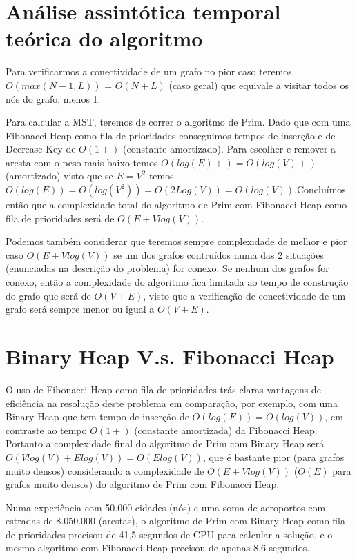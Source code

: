 \documentclass{scrartcl}
\begin{document}
\section*{Análise assintótica temporal teórica do algoritmo}

Para verificarmos a conectividade de um grafo no pior caso teremos $O(max(N-1,L))$ = $O(N+L)$ (caso geral) que equivale a visitar todos os nós do grafo, menos 1.

Para calcular a MST, teremos de correr o algoritmo de Prim. Dado que com uma Fibonacci Heap como fila de prioridades conseguimos tempos de inserção e de Decrease-Key de $O(1+)$ (constante amortizado). Para escolher e remover a aresta com o peso mais baixo temos $O(log(E)+) = O(log(V)+)$ (amortizado) visto que se $E = V^2$ temos $O(log(E)) = O(log(V^2)) = O(2Log(V)) = O(log(V))$.Concluímos então que a complexidade total do algoritmo de Prim com Fibonacci Heap como fila de prioridades será de $O(E + V log (V))$.

Podemos também considerar que teremos sempre complexidade de melhor e pior caso $O(E + V log (V))$ se um dos grafos contruídos numa das 2 situações (enunciadas na descrição do problema) for conexo. Se nenhum dos grafos for conexo, então a complexidade do algoritmo fica limitada ao tempo de construção do grafo que será de $O(V + E)$, visto que a verificação de conectividade de um grafo será sempre menor ou igual a $O(V + E)$.

\section*{Binary Heap V.s. Fibonacci Heap}

O uso de Fibonacci Heap como fila de prioridades trás claras vantagens de eficiência na resolução deste problema em comparação, por exemplo, com uma Binary Heap que tem tempo de inserção de $O(log(E)) = O(log(V))$, em contraste ao tempo $O(1+)$ (constante amortizada) da Fibonacci Heap. Portanto a complexidade final do algoritmo de Prim com Binary Heap será $O(Vlog(V) + Elog(V)) =  O(Elog(V))$, que é bastante pior (para grafos muito densos) considerando a complexidade de $O(E + V log(V))$ ($O(E)$ para grafos muito densos) do algoritmo de Prim com Fibonacci Heap.

Numa experiência com 50.000 cidades (nós) e uma soma de aeroportos com estradas de 8.050.000 (arestas), o algoritmo de Prim com Binary Heap como fila de prioridades precisou de 41,5 segundos de CPU para calcular a solução, e o mesmo algoritmo com Fibonacci Heap precisou de apenas 8,6 segundos.
\end{document}
